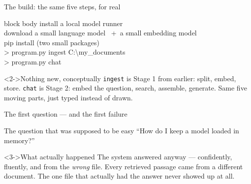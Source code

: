 \documentclass[aspectratio=169,11pt]{beamer}
\begin{document}
\begin{frame}{The build: the same five steps, for real}
  \centering
  \begin{beamercolorbox}[sep=8pt,rounded=true,wd=0.92\textwidth]{block body}
    \ttfamily\footnotesize
    install a local model runner \\
    download a small language model \ +\ a small embedding model \\
    pip install (two small packages) \\
    \color{ragorange}> program.py ingest C:\textbackslash my\_documents \\
    \color{raggreen}> program.py chat
  \end{beamercolorbox}
  \bigskip
  \begin{block}<2->{Nothing new, conceptually}
    \texttt{ingest} is Stage 1 from earlier: split, embed, store.
    \texttt{chat} is Stage 2: embed the question, search, assemble, generate.
    Same five moving parts, just typed instead of drawn.
  \end{block}
  \medskip
  \centering\small\color{raggray}
\end{frame}

\begin{frame}{The first question --- and the first failure}
  \begin{block}{The question that was supposed to be easy}
    \centering\large ``How do I keep a model loaded in memory?''
  \end{block}
  \medskip
  \bigskip
  \begin{alertblock}<3->{What actually happened}
    The system answered anyway --- confidently, fluently, and from the
    \emph{wrong} file. Every retrieved passage came from a different
    document. The one file that actually had the answer never showed up at
    all.
  \end{alertblock}
  \medskip
\end{frame}
\end{document}
